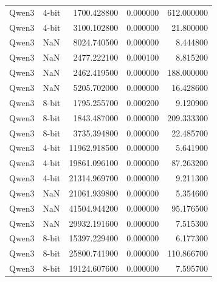 \begin{tabular}{llrrr}
Qwen3 & 4-bit & 1700.428800 & 0.000000 & 612.000000 \\
Qwen3 & 4-bit & 3100.102800 & 0.000000 & 21.800000 \\
Qwen3 & NaN & 8024.740500 & 0.000000 & 8.444800 \\
Qwen3 & NaN & 2477.222100 & 0.000100 & 8.815200 \\
Qwen3 & NaN & 2462.419500 & 0.000000 & 188.000000 \\
Qwen3 & NaN & 5205.702000 & 0.000000 & 16.428600 \\
Qwen3 & 8-bit & 1795.255700 & 0.000200 & 9.120900 \\
Qwen3 & 8-bit & 1843.487000 & 0.000000 & 209.333300 \\
Qwen3 & 8-bit & 3735.394800 & 0.000000 & 22.485700 \\
Qwen3 & 4-bit & 11962.918500 & 0.000000 & 5.641900 \\
Qwen3 & 4-bit & 19861.096100 & 0.000000 & 87.263200 \\
Qwen3 & 4-bit & 21314.969700 & 0.000000 & 9.211300 \\
Qwen3 & NaN & 21061.939800 & 0.000000 & 5.354600 \\
Qwen3 & NaN & 41504.944200 & 0.000000 & 95.176500 \\
Qwen3 & NaN & 29932.191600 & 0.000000 & 7.515300 \\
Qwen3 & 8-bit & 15397.229400 & 0.000000 & 6.177300 \\
Qwen3 & 8-bit & 25800.741900 & 0.000000 & 110.866700 \\
Qwen3 & 8-bit & 19124.607600 & 0.000000 & 7.595700 \\
\bottomrule
\end{tabular}
